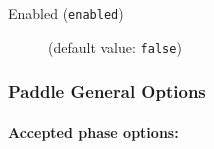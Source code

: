 \documentclass{article}
\begin{document}
\begin{description}

\item[Enabled ({\tt enabled})]
(default value: {\tt false})






\end{description}

\subsubsection{Paddle General Options}


\paragraph{Accepted phase options:} 
\end{document}
